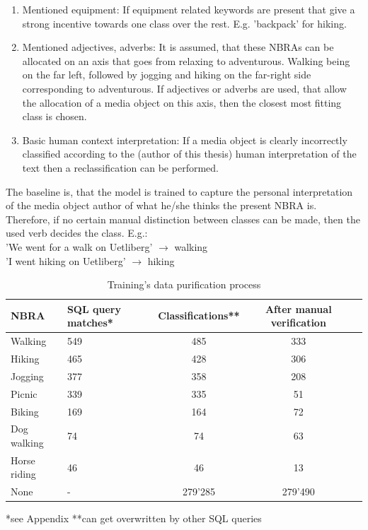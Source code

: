 \newline
\begin{enumerate}
    \item Mentioned equipment: If equipment related keywords are present that give a strong incentive towards one class over the rest. E.g. 'backpack' for hiking.
    \item Mentioned adjectives, adverbs: It is assumed, that these NBRAs can be allocated on an axis that goes from relaxing to adventurous. Walking being on the far left, followed by jogging and hiking on the far-right side corresponding to adventurous. If adjectives or adverbs are used, that allow the allocation of a media object on this axis, then the closest most fitting class is chosen.
    \item Basic human context interpretation: If a media object is clearly incorrectly classified according to the (author of this thesis) human interpretation of the text then a reclassification can be performed.
\end{enumerate}

The baseline is, that the model is trained to capture the personal interpretation of the media object author of what he/she thinks the present NBRA is. Therefore, if no certain manual distinction between classes can be made, then the used verb decides the class. E.g.:\\
'We went for a walk on Uetliberg' $\to$ walking \\
'I went hiking on Uetliberg' $\to$ hiking\\

\begin{table}[ht]
\begin{center}
\caption{Training's data purification process}\vspace{1ex}
\label{tab:trainingsdata}
\begin{tabular}{llccc}\hline
NBRA & SQL query matches* & Classifications** & After manual verification \\ \hline
Walking & 549 & 485 & 333 \\
Hiking & 465 & 428 & 306 \\
Jogging & 377 & 358 & 208 \\
Picnic & 339 & 335 & 51 \\
Biking & 169 & 164 & 72 \\
Dog walking & 74 & 74 & 63 \\
Horse riding & 46 & 46 & 13 \\
None & - & 279'285 & 279'490 \\ \hline
\end{tabular}
\newline
*see Appendix **can get overwritten by other SQL queries
\end{center}
\end{table}

